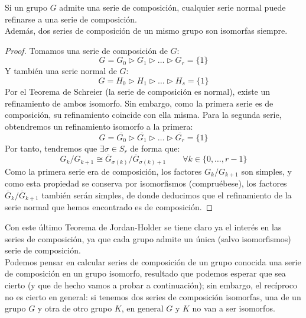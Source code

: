 \begin{teo}
    Si un grupo $G$ admite una serie de composición, cualquier serie normal puede refinarse a una serie de composición.\\

    \noindent
    Además, dos series de composición de un mismo grupo son isomorfas siempre.
    \begin{proof}
        Tomamos una serie de composición de $G$:
        \begin{equation*}
            G= G_0 \rhd G_1 \rhd \ldots \rhd G_r = \{1\}
        \end{equation*}
        Y también una serie normal de $G$:
        \begin{equation*}
            G=H_0 \rhd H_1 \rhd \ldots \rhd H_s = \{1\}
        \end{equation*}
        Por el Teorema de Schreier (la serie de composición es normal), existe un refinamiento de ambos isomorfo. Sin embargo, como la primera serie es de composición, su refinamiento coincide con ella misma. Para la segunda serie, obtendremos un refinamiento isomorfo a la primera:
        \begin{equation*}
            G = \overline{G_0} \rhd \overline{G_1} \rhd \ldots \rhd \overline{G_r} = \{1\}
        \end{equation*}
        Por tanto, tendremos que $\exists \sigma\in S_r$ de forma que:
        \begin{equation*}
            G_k/G_{k+1} \cong \overline{G}_{\sigma(k)}/\overline{G}_{\sigma(k)+1} \qquad \forall k \in \{0,\ldots,r-1\}
        \end{equation*}
        Como la primera serie era de composición, los factores $G_k/G_{k+1}$ son simples, y como esta propiedad se conserva por isomorfismos (compruébese), los factores $\overline{G}_k/\overline{G}_{k+1}$ también serán simples, de donde deducimos que el refinamiento de la serie normal que hemos encontrado es de composición.
    \end{proof}
\end{teo}

\noindent
Con este último Teorema de Jordan-Holder se tiene claro ya el interés en las series de composición, ya que cada grupo admite un única (salvo isomorfismos) serie de composición.\\

\noindent
Podemos pensar en calcular series de composición de un grupo conocida una serie de composición en un grupo isomorfo, resultado que podemos esperar que sea cierto (y que de hecho vamos a probar a continuación); sin embargo, el recíproco no es cierto en general: si tenemos dos series de composición isomorfas, una de un grupo $G$ y otra de otro grupo $K$, en general $G$ y $K$ no van a ser isomorfos.

